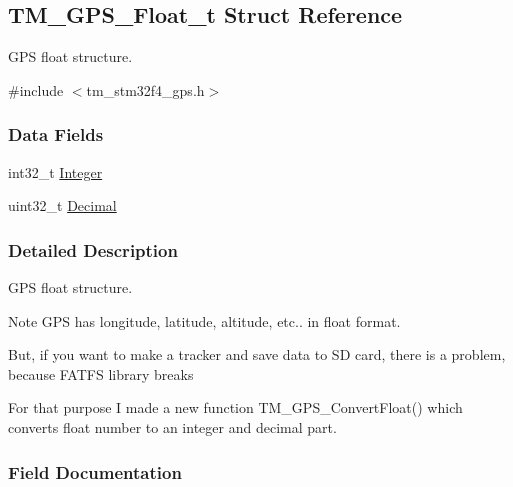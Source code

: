 \hypertarget{struct_t_m___g_p_s___float__t}{}\subsection{T\+M\+\_\+\+G\+P\+S\+\_\+\+Float\+\_\+t Struct Reference}
\label{struct_t_m___g_p_s___float__t}


G\+P\+S float structure.  




{\ttfamily \#include $<$tm\+\_\+stm32f4\+\_\+gps.\+h$>$}

\subsubsection*{Data Fields}
\begin{DoxyCompactItemize}
\item 
int32\+\_\+t \hyperlink{struct_t_m___g_p_s___float__t_a4cf167ca72295ce98fe58afd65ef5b5e}{Integer}
\item 
uint32\+\_\+t \hyperlink{struct_t_m___g_p_s___float__t_a1f1a4005542eb36b6420473d24d99a42}{Decimal}
\end{DoxyCompactItemize}


\subsubsection{Detailed Description}
G\+P\+S float structure. 

\begin{DoxyNote}{Note}
G\+P\+S has longitude, latitude, altitude, etc.. in float format. \begin{DoxyVerb}    But, if you want to make a tracker and save data to SD card, there is a problem, because FATFS library breaks %

    For that purpose I made a new function TM_GPS_ConvertFloat() which converts float number to an integer and decimal part.\end{DoxyVerb}
 
\end{DoxyNote}


\subsubsection{Field Documentation}
\hypertarget{struct_t_m___g_p_s___float__t_a1f1a4005542eb36b6420473d24d99a42}{}
